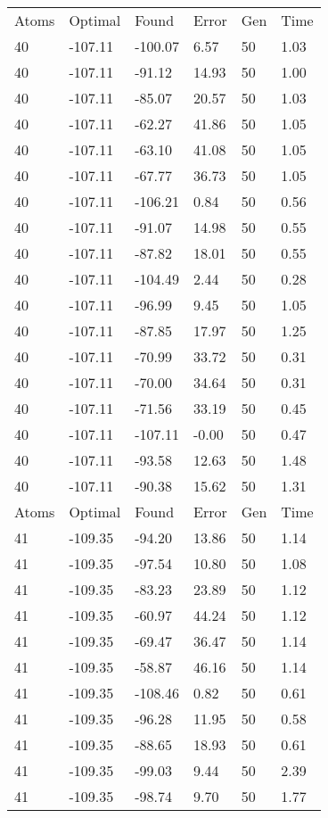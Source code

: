 \documentclass{report}
\begin{document}
\begin{appendix}
\begin{longtable}{llllll}
Atoms & Optimal & Found & Error & Gen & Time \\
40 & -107.11 & -100.07 & 6.57 & 50 & 1.03 \\
40 & -107.11 & -91.12 & 14.93 & 50 & 1.00 \\
40 & -107.11 & -85.07 & 20.57 & 50 & 1.03 \\
40 & -107.11 & -62.27 & 41.86 & 50 & 1.05 \\
40 & -107.11 & -63.10 & 41.08 & 50 & 1.05 \\
40 & -107.11 & -67.77 & 36.73 & 50 & 1.05 \\
40 & -107.11 & -106.21 & 0.84 & 50 & 0.56 \\
40 & -107.11 & -91.07 & 14.98 & 50 & 0.55 \\
40 & -107.11 & -87.82 & 18.01 & 50 & 0.55 \\
40 & -107.11 & -104.49 & 2.44 & 50 & 0.28 \\
40 & -107.11 & -96.99 & 9.45 & 50 & 1.05 \\
40 & -107.11 & -87.85 & 17.97 & 50 & 1.25 \\
40 & -107.11 & -70.99 & 33.72 & 50 & 0.31 \\
40 & -107.11 & -70.00 & 34.64 & 50 & 0.31 \\
40 & -107.11 & -71.56 & 33.19 & 50 & 0.45 \\
40 & -107.11 & -107.11 & -0.00 & 50 & 0.47 \\
40 & -107.11 & -93.58 & 12.63 & 50 & 1.48 \\
40 & -107.11 & -90.38 & 15.62 & 50 & 1.31 \\
Atoms & Optimal & Found & Error & Gen & Time \\
41 & -109.35 & -94.20 & 13.86 & 50 & 1.14 \\
41 & -109.35 & -97.54 & 10.80 & 50 & 1.08 \\
41 & -109.35 & -83.23 & 23.89 & 50 & 1.12 \\
41 & -109.35 & -60.97 & 44.24 & 50 & 1.12 \\
41 & -109.35 & -69.47 & 36.47 & 50 & 1.14 \\
41 & -109.35 & -58.87 & 46.16 & 50 & 1.14 \\
41 & -109.35 & -108.46 & 0.82 & 50 & 0.61 \\
41 & -109.35 & -96.28 & 11.95 & 50 & 0.58 \\
41 & -109.35 & -88.65 & 18.93 & 50 & 0.61 \\
41 & -109.35 & -99.03 & 9.44 & 50 & 2.39 \\
41 & -109.35 & -98.74 & 9.70 & 50 & 1.77 \\

\end{longtable}
\end{appendix}
\end{document}
